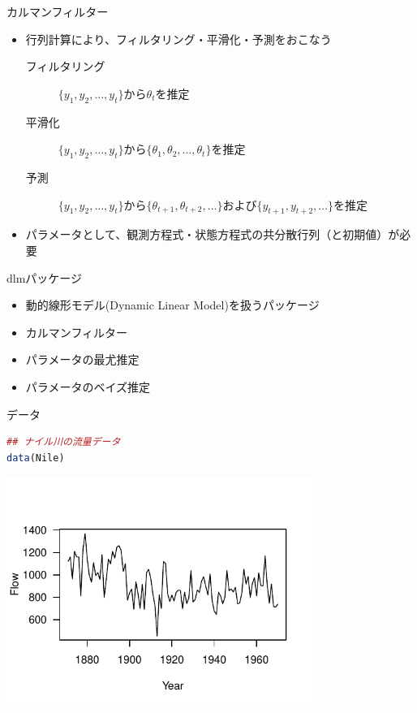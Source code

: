 \documentclass[dvipdfmx,12pt]{beamer}
\begin{document}
\begin{frame}{カルマンフィルター}
  \begin{itemize}
  \item 行列計算により、フィルタリング・平滑化・予測をおこなう
     \begin{description}
     \item[フィルタリング] $\{y_1,y_2,\dots,y_t\}$から$\theta_t$を推定
     \item[平滑化] $\{y_1,y_2,\dots,y_t\}$から$\{\theta_1,\theta_2,\dots,\theta_t\}$を推定
     \item[予測] $\{y_1,y_2,\dots,y_t\}$から$\{\theta_{t+1},\theta_{t+2},\dots\}$および$\{y_{t+1},y_{t+2},\dots\}$を推定
     \end{description}
  \item パラメータとして、観測方程式・状態方程式の共分散行列（と初期値）が必要
  \end{itemize}
\end{frame}

\begin{frame}{dlmパッケージ}
  \begin{itemize}
  \item 動的線形モデル(Dynamic Linear Model)を扱うパッケージ
  \item カルマンフィルター
  \item パラメータの最尤推定
  \item パラメータのベイズ推定
  \end{itemize}
\end{frame}

\begin{frame}[fragile]{データ}
  \begin{lstlisting}[language=R]
## ナイル川の流量データ
data(Nile)
  \end{lstlisting}

  \begin{center}
    \includegraphics[width=10cm]{Nile}
  \end{center}
\end{frame}
\end{document}

